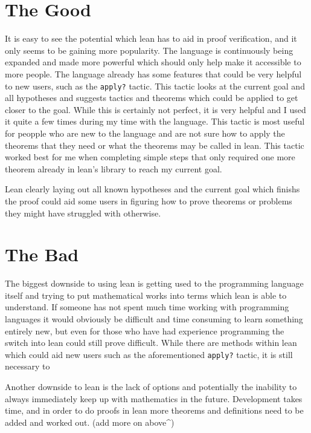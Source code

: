 \documentclass[
  letterpaper,
]{scrreprt}
\theoremstyle{remark}
\begin{document}
\hypertarget{the-good}{%
\section{The Good}\label{the-good}}

It is easy to see the potential which lean has to aid in proof
verification, and it only seems to be gaining more popularity. The
language is continuously being expanded and made more powerful which
should only help make it accessible to more people. The language already
has some features that could be very helpful to new users, such as the
\texttt{apply?} tactic. This tactic looks at the current goal and all
hypotheses and suggests tactics and theorems which could be applied to
get closer to the goal. While this is certainly not perfect, it is very
helpful and I used it quite a few times during my time with the
language. This tactic is most useful for peopple who are new to the
language and are not sure how to apply the theorems that they need or
what the theorems may be called in lean. This tactic worked best for me
when completing simple steps that only required one more theorem already
in lean's library to reach my current goal.

Lean clearly laying out all known hypotheses and the current goal which
finishs the proof could aid some users in figuring how to prove theorems
or problems they might have struggled with otherwise.

\hypertarget{the-bad}{%
\section{The Bad}\label{the-bad}}

The biggest downside to using lean is getting used to the programming
language itself and trying to put mathematical works into terms which
lean is able to understand. If someone has not spent much time working
with programming languages it would obviously be difficult and time
consuming to learn something entirely new, but even for those who have
had experience programming the switch into lean could still prove
difficult. While there are methods within lean which could aid new users
such as the aforementioned \texttt{apply?} tactic, it is still necessary
to

Another downside to lean is the lack of options and potentially the
inability to always immediately keep up with mathematics in the future.
Development takes time, and in order to do proofs in lean more theorems
and definitions need to be added and worked out. (add more on above\^{})
\end{document}
